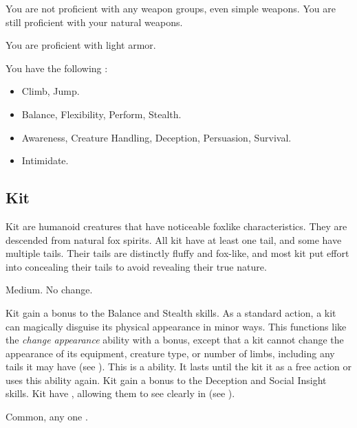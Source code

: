            You are not proficient with any weapon groups, even simple weapons.
            You are still proficient with your natural weapons.

            You are proficient with light armor.

            You have the following :
            \begin{itemize}
                \item {} Climb, Jump.
                \item {} Balance, Flexibility, Perform, Stealth.
                \item {} Awareness, Creature Handling, Deception, Persuasion, Survival.
                \item {} Intimidate.
            \end{itemize}

    \subsection{Kit}

        Kit are humanoid creatures that have noticeable foxlike characteristics.
        They are descended from natural fox spirits.
        All kit have at least one tail, and some have multiple tails.
        Their tails are distinctly fluffy and fox-like, and most kit put effort into concealing their tails to avoid revealing their true nature.

         Medium.
         No change.
        \begin{itemize}
             Kit gain a  bonus to the Balance and Stealth skills.
             As a standard action, a kit can magically disguise its physical appearance in minor ways.
                This functions like the \textit{change appearance} ability with a  bonus, except that a kit cannot change the appearance of its equipment, creature type, or number of limbs, including any tails it may have (see ).
                This is a \magical ability.
                It lasts until the kit  it as a free action or uses this ability again.
             Kit gain a  bonus to the Deception and Social Insight skills.
             Kit have , allowing them to see clearly in  (see ).
        \end{itemize}
         Common, any one .

